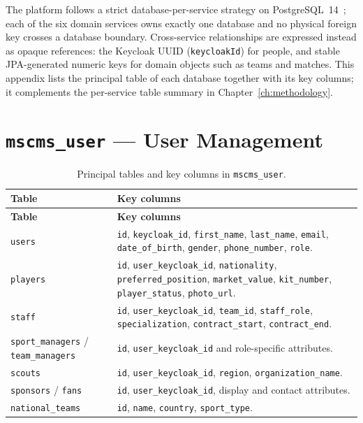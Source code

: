 The platform follows a strict database-per-service strategy on PostgreSQL~14~\cite{postgres};
each of the six domain services owns exactly one database and no physical foreign key crosses
a database boundary. Cross-service relationships are expressed instead as opaque references:
the Keycloak UUID (\texttt{keycloakId}) for people, and stable JPA-generated numeric keys for
domain objects such as teams and matches. This appendix lists the principal table of each
database together with its key columns; it complements the per-service table summary in
Chapter~\ref{ch:methodology}.

\section{\texttt{mscms\_user} --- User Management}
\label{app:schema-user}

\renewcommand{\arraystretch}{1.2}
\begin{longtable}{p{} p{}}
\caption{Principal tables and key columns in \texttt{mscms\_user}.}
\label{tab:schema-user}\\
\toprule
\textbf{Table} & \textbf{Key columns} \\
\midrule
\endfirsthead
\toprule
\textbf{Table} & \textbf{Key columns} \\
\midrule
\endhead
\bottomrule
\endlastfoot
\texttt{users} & \texttt{id}, \texttt{keycloak\_id}, \texttt{first\_name}, \texttt{last\_name}, \texttt{email}, \texttt{date\_of\_birth}, \texttt{gender}, \texttt{phone\_number}, \texttt{role}. \\
\texttt{players} & \texttt{id}, \texttt{user\_keycloak\_id}, \texttt{nationality}, \texttt{preferred\_position}, \texttt{market\_value}, \texttt{kit\_number}, \texttt{player\_status}, \texttt{photo\_url}. \\
\texttt{staff} & \texttt{id}, \texttt{user\_keycloak\_id}, \texttt{team\_id}, \texttt{staff\_role}, \texttt{specialization}, \texttt{contract\_start}, \texttt{contract\_end}. \\
\texttt{sport\_managers} / \texttt{team\_managers} & \texttt{id}, \texttt{user\_keycloak\_id} and role-specific attributes. \\
\texttt{scouts} & \texttt{id}, \texttt{user\_keycloak\_id}, \texttt{region}, \texttt{organization\_name}. \\
\texttt{sponsors} / \texttt{fans} & \texttt{id}, \texttt{user\_keycloak\_id}, display and contact attributes. \\
\texttt{national\_teams} & \texttt{id}, \texttt{name}, \texttt{country}, \texttt{sport\_type}. \\
\end{longtable}

